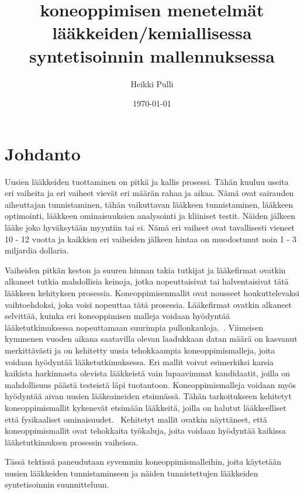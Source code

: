 \documentclass[finnish,twoside,censored,subject,sw-line]{HYthesisML}
\title{koneoppimisen menetelmät lääkkeiden/kemiallisessa syntetisoinnin mallennuksessa}
\author{Heikki Pulli}
\date{\today}
\begin{document}
\maketitle

\newpage
\mytableofcontents
\mainmatter

\chapter{Johdanto}

Uusien lääkkeiden tuottaminen on pitkä ja kallis prosessi.
Tähän kuuluu useita eri vaiheita ja eri vaiheet vievät eri määrän rahaa ja aikaa.
Nämä ovat sairauden aiheuttajan tunnistaminen, tähän vaikuttavan lääkkeen tunnistaminen, lääkkeen optimointi, lääkkeen ominaisuuksien analysointi ja kliiniset testit.
Näiden jälkeen lääke joko hyväksytään myyntiin tai ei.
Nämä eri vaiheet ovat tavallisesti vieneet 10 - 12 vuotta ja kaikkien eri vaiheiden jälkeen hintaa on muodostunut noin 1 - 3 miljardia dollaria.~\cite{EkinsSean2019Emlf}

Vaiheiden pitkän keston ja suuren hinnan takia tutkijat ja lääkefirmat ovatkin alkaneet tutkia mahdollisia keinoja, jotka nopeuttaisivat tai halventaisivat tätä lääkkeen kehityksen prosessia.
Koneoppimisenmallit ovat nousseet houkuttelevaksi vaihtoehdoksi, joka voisi nopeuttaa tätä prosessia.
Lääkefirmat ovatkin alkaneet selvittää, kuinka eri koneoppimisen malleja voidaan hyödyntää lääketutkimuksessa nopeuttamaan suurimpia pullonkauloja.~\cite{EkinsSean2019Emlf}.
Viimeisen kymmenen vuoden aikana saatavilla olevan laadukkaan datan määrä on kasvanut merkittävästi ja on kehitetty uusia tehokkaampia koneoppimismalleja, joita voidaan hyödyntää lääketutkimuksessa.
Eri mallit voivat esimerkiksi karsia kaikista harkinnasta olevista lääkkeistä vain lupaavimmat kandidaatit, joilla on mahdollisuus päästä testeistä läpi tuotantoon.
Koneoppimismalleja voidaan myös hyödyntää aivan uusien lääkeaineiden etsinnässä.
Tähän tarkoitukseen kehitetyt koneoppimismallit kykenevät etsimään lääkkeitä, joilla on halutut lääkkeelliset että fysikaaliset ominaisuudet.~\cite{VamathevanJessica2019Aoml}
Kehitetyt mallit ovatkin näyttäneet, että koneoppimismallit ovat tehokkaita työkaluja, joita voidaan hyödyntää kaikissa lääketutkimuksen prosessin vaiheissa.

Tässä tektissä paneudutaan syvemmin koneoppimismalleihin, joita käytetään uusien lääkkeiden tunnistaminseen ja näiden tunnistettujen lääkkeiden syntetisoinnin suunnitteluun.
\end{document}
